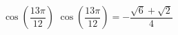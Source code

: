 {$\cos\left(\dfrac{13\pi}{12}\right)$}
{$\cos\left(\dfrac{13\pi}{12}\right) = -\dfrac{\sqrt{6}+\sqrt{2}}{4}$}
